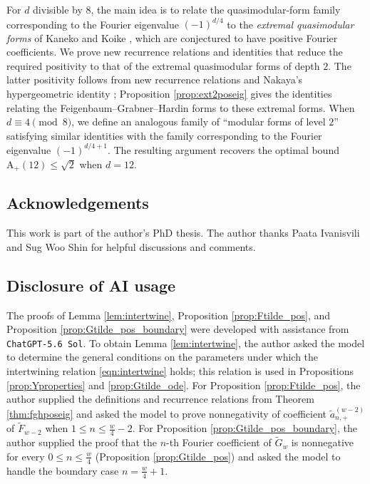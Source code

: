 \documentclass[10pt,reqno]{amsproc}
\newcommand{\wtilde}{\widetilde}
\newcommand{\rA}{\mathrm{A}}
\newcommand{\1}{\mathds{1}}	%
\theoremstyle{definition}
\theoremstyle{remark}
\begin{document}
For $d$ divisible by $8$, the main idea is to relate the quasimodular-form family corresponding to the Fourier eigenvalue $(-1)^{d/4}$ to the \emph{extremal quasimodular forms} of Kaneko and Koike \cite{kaneko2006extremal}, which are conjectured to have positive Fourier coefficients.
We prove new recurrence relations and identities that reduce the required positivity to that of the extremal quasimodular forms of depth $2$.
The latter positivity follows from new recurrence relations and Nakaya's hypergeometric identity \cite{nakaya2024determination}; Proposition \ref{prop:ext2poseig} gives the identities relating the Feigenbaum--Grabner--Hardin forms to these extremal forms.
When $d \equiv 4 \pmod{8}$, we define an analogous family of ``modular forms of level $2$'' satisfying similar identities with the family corresponding to the Fourier eigenvalue $(-1)^{d/4+1}$.
The resulting argument recovers the optimal bound $\rA_+(12) \le \sqrt{2}$ when $d = 12$.


\subsection*{Acknowledgements}
This work is part of the author's PhD thesis.
The author thanks Paata Ivanisvili and Sug Woo Shin for helpful discussions and comments.

\subsection*{Disclosure of AI usage}
The proofs of Lemma \ref{lem:intertwine}, Proposition \ref{prop:Ftilde_pos}, and Proposition \ref{prop:Gtilde_pos_boundary} were developed with assistance from \texttt{ChatGPT-5.6 Sol}.
To obtain Lemma \ref{lem:intertwine}, the author asked the model to determine the general conditions on the parameters under which the intertwining relation \eqref{eqn:intertwine} holds; this relation is used in Propositions \ref{prop:Yproperties} and \ref{prop:Gtilde_ode}.
For Proposition \ref{prop:Ftilde_pos}, the author supplied the definitions and recurrence relations from Theorem \ref{thm:fghposeig} and asked the model to prove nonnegativity of coefficient $\tilde{a}_{n,+}^{(w-2)}$ of $\wtilde{F}_{w-2}$ when $1 \le n \le \frac{w}{4} - 2$.
For Proposition \ref{prop:Gtilde_pos_boundary}, the author supplied the proof that the $n$-th Fourier coefficient of $\wtilde{G}_{w}$ is nonnegative for every $0 \le n \le \frac{w}{4}$ (Proposition \ref{prop:Gtilde_pos}) and asked the model to handle the boundary case $n = \frac{w}{4} + 1$.
\end{document}

